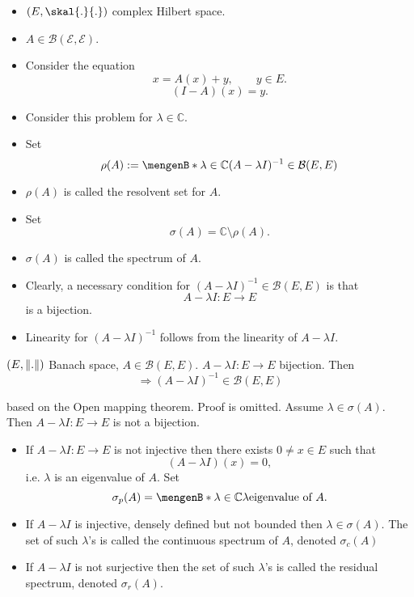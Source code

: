 \begin{itemize}
	\item $(E,\skal{.}{.})$ complex Hilbert space.
	\item $A \in \mathcal{B(E,E)}$. 
	\item Consider the equation
\[
	x = A(x)+ y, \qquad y \in E.
\]
\[
	(I-A)(x)= y.
\]
\item Consider this problem for $\lambda \in \mathbb{C}$. \\
\item Set \[
	\rho(A) := \set[\lambda \in \mathbb{C}]{(A- \lambda I)^{-1} \in \mathcal{B}(E,E)}
\]
\item $\rho(A)$ is called the resolvent set for $A$.
\item Set \[
	\sigma(A) = \mathbb{C} \setminus \rho(A).
\]
\item $\sigma(A)$ is called the spectrum of $A$.
\item Clearly, a necessary condition for $(A-\lambda I)^{-1} \in \mathcal{B}(E,E)$ is that 
\[
	A - \lambda I:E \to E
\]
is a bijection.
\item Linearity for $(A-\lambda I)^{-1}$ follows from the linearity of $A-\lambda I$.

\end{itemize}
\begin{theorem}
	$(E,\norm{.})$ Banach space, $A \in \mathcal{B}(E,E)$. $A-\lambda I: E \to E$ bijection. Then
	\[
		\Rightarrow (A- \lambda I)^{-1} \in \mathcal{B}(E,E)
	\]
\end{theorem}
\begin{beweis}
	based on the Open mapping theorem. Proof is omitted. Assume $\lambda \in \sigma(A)$. Then $A-\lambda I:E \to E$ is not a bijection.

\begin{itemize}
	\item If $A-\lambda I: E \to E$ is not injective then there exists $0 \neq x \in  E $ such that
	\[
		(A- \lambda I)(x) = 0,
	\]
	i.e. $\lambda$ is an eigenvalue of $A$.
	Set	
	\[
		\sigma_p(A) = \set[\lambda \in \mathbb{C}]{\lambda \text{eigenvalue of $A$}}.
	\]
	\item If $A-\lambda I$ is injective, densely defined but not bounded then $\lambda \in \sigma(A)$. The set of such $\lambda$'s is called the continuous spectrum of $A$, denoted $\sigma_c(A)$
	\item If $A-\lambda I$ is not surjective then the set of such $\lambda$'s is called the residual spectrum, denoted $\sigma _r(A)$.
\end{itemize}
\end{beweis}
